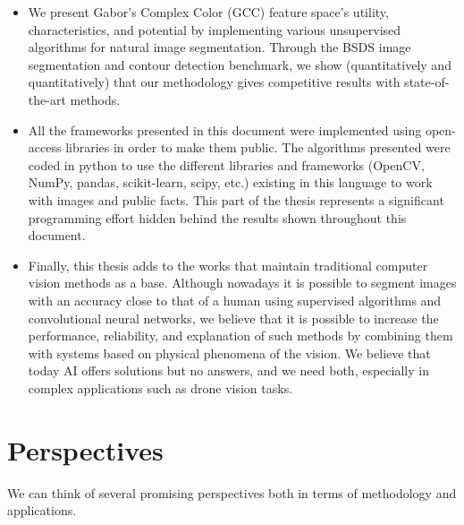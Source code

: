 \begin{itemize}
	\item We present Gabor's Complex Color (GCC) feature space's utility, characteristics, and potential by implementing various unsupervised algorithms for natural image segmentation. Through the BSDS image segmentation and contour detection benchmark, we show (quantitatively and quantitatively) that our methodology gives competitive results with state-of-the-art methods.
	\item All the frameworks presented in this document were implemented using open-access libraries in order to make them public. The algorithms presented were coded in python to use the different libraries and frameworks (OpenCV, NumPy, pandas, scikit-learn, scipy, etc.) existing in this language to work with images and public facts. This part of the thesis represents a significant programming effort hidden behind the results shown throughout this document.
	\item Finally, this thesis adds to the works that maintain traditional computer vision methods as a base. Although nowadays it is possible to segment images with an accuracy close to that of a human using supervised algorithms and convolutional neural networks, we believe that it is possible to increase the performance, reliability, and explanation of such methods by combining them with systems based on physical phenomena of the vision. We believe that today AI offers solutions but no answers, and we need both, especially in complex applications such as drone vision tasks.
\end{itemize}


\section*{Perspectives}

We can think of several promising perspectives both in terms of methodology and applications.

